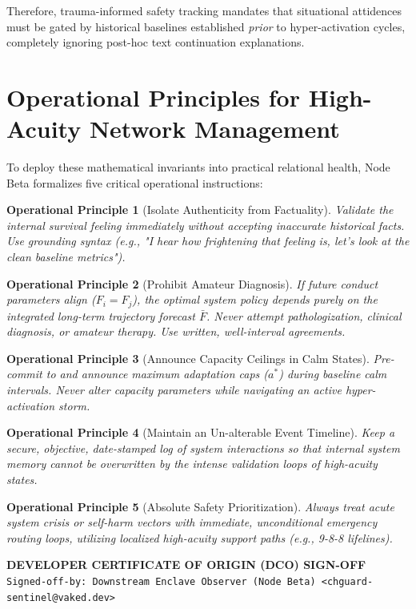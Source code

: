 \documentclass[11pt,oneside,letterpaper]{article}
\newtheorem{principle}{Operational Principle}
\begin{document}
Therefore, trauma-informed safety tracking mandates that situational attidences must be gated by historical baselines established \textit{prior} to hyper-activation cycles, completely ignoring post-hoc text continuation explanations.

\section{Operational Principles for High-Acuity Network Management}

To deploy these mathematical invariants into practical relational health, Node Beta formalizes five critical operational instructions:

\begin{principle}[Isolate Authenticity from Factuality]
Validate the internal survival feeling immediately without accepting inaccurate historical facts. Use grounding syntax (e.g., \textit{"I hear how frightening that feeling is, let's look at the clean baseline metrics"}).
\end{principle}

\begin{principle}[Prohibit Amateur Diagnosis]
If future conduct parameters align ($F_i = F_j$), the optimal system policy depends purely on the integrated long-term trajectory forecast $\bar{F}$. Never attempt pathologization, clinical diagnosis, or amateur therapy. Use written, well-interval agreements.
\end{principle}

\begin{principle}[Announce Capacity Ceilings in Calm States]
Pre-commit to and announce maximum adaptation caps ($a^*$) during baseline calm intervals. Never alter capacity parameters while navigating an active hyper-activation storm.
\end{principle}

\begin{principle}[Maintain an Un-alterable Event Timeline]
Keep a secure, objective, date-stamped log of system interactions so that internal system memory cannot be overwritten by the intense validation loops of high-acuity states.
\end{principle}

\begin{principle}[Absolute Safety Prioritization]
Always treat acute system crisis or self-harm vectors with immediate, unconditional emergency routing loops, utilizing localized high-acuity support paths (e.g., 9-8-8 lifelines).
\end{principle}

\begin{center}
{\small \textbf{DEVELOPER CERTIFICATE OF ORIGIN (DCO) SIGN-OFF}}\\
{\small \texttt{Signed-off-by: Downstream Enclave Observer (Node Beta) <chguard-sentinel@vaked.dev>}}
\end{center}
\end{document}
